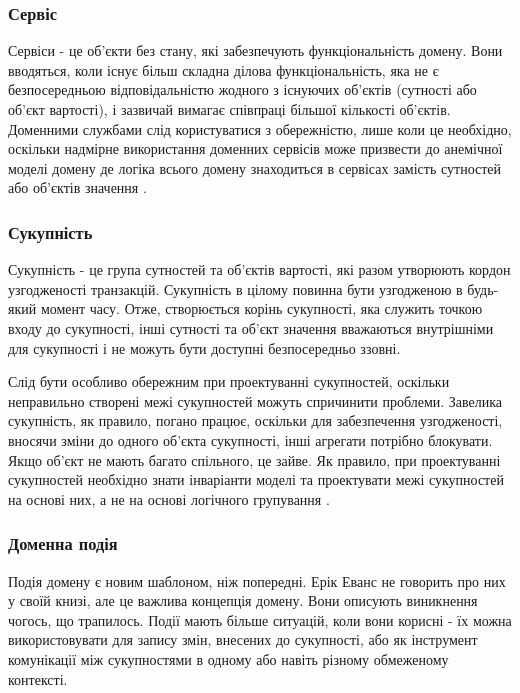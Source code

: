 \subsubsection{Сервіс}
Сервіси - це об'єкти без стану, які забезпечують функціональність домену.
Вони вводяться, коли існує більш складна ділова функціональність,
яка не є безпосередньою відповідальністю жодного з існуючих об'єктів 
(сутності або об'єкт вартості), і зазвичай вимагає співпраці більшої
кількості об'єктів. Доменними службами слід користуватися з обережністю,
лише коли це необхідно, оскільки надмірне використання доменних сервісів
може призвести до анемічної моделі домену де логіка всього домену
знаходиться в сервісах замість сутностей або об'єктів значення \cite{ddd-vernon}.

\subsubsection{Сукупність}
Сукупність - це група сутностей та об'єктів вартості,
які разом утворюють кордон узгодженості транзакцій.
Сукупність в цілому повинна бути узгодженою в будь-який момент часу.
Отже, створюється корінь сукупності, яка служить точкою входу до сукупності,
інші сутності та об'єкт значення вважаються внутрішніми для
сукупності і не можуть бути доступні безпосередньо ззовні.

Слід бути особливо обережним при проектуванні сукупностей,
оскільки неправильно створені межі сукупностей можуть спричинити проблеми.
Завелика сукупність, як правило, погано працює, оскільки для
забезпечення узгодженості, вносячи зміни до одного об'єкта сукупності,
інші агрегати потрібно блокувати. Якщо об'єкт не мають багато спільного,
це зайве. Як правило, при проектуванні сукупностей необхідно знати
інваріанти моделі та проектувати межі сукупностей на основі них,
а не на основі логічного групування \cite{ddd-vernon}.

\subsubsection{Доменна подія}

Подія домену є новим шаблоном, ніж попередні.
Ерік Еванс не говорить про них у своїй книзі, але це важлива концепція домену.
Вони описують виникнення чогось, що трапилось. Події мають більше ситуацій,
коли вони корисні - їх можна використовувати для запису змін, внесених до сукупності,
або як інструмент комунікації між сукупностями в одному або навіть
різному обмеженому контексті. 

